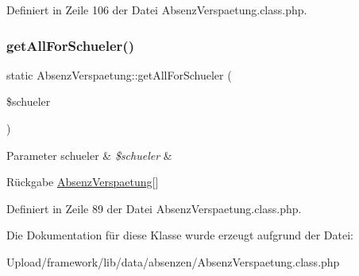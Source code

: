 Definiert in Zeile 106 der Datei Absenz\+Verspaetung.\+class.\+php.

\mbox{\label{class_absenz_verspaetung_a894d4ccf9e72dd77cf6ef4150ca27cc3}} 
\subsubsection{\texorpdfstring{get\+All\+For\+Schueler()}{getAllForSchueler()}}
{\footnotesize\ttfamily static Absenz\+Verspaetung\+::get\+All\+For\+Schueler (\begin{DoxyParamCaption}\item[{}]{\$schueler }\end{DoxyParamCaption})\hspace{0.3cm}{\ttfamily [static]}}


\begin{DoxyParams}[1]{Parameter}
schueler & {\em \$schueler} & \\
\hline
\end{DoxyParams}
\begin{DoxyReturn}{Rückgabe}
\mbox{\hyperlink{class_absenz_verspaetung}{Absenz\+Verspaetung}}\mbox{[}\mbox{]} 
\end{DoxyReturn}


Definiert in Zeile 89 der Datei Absenz\+Verspaetung.\+class.\+php.



Die Dokumentation für diese Klasse wurde erzeugt aufgrund der Datei\+:\begin{DoxyCompactItemize}
\item 
Upload/framework/lib/data/absenzen/Absenz\+Verspaetung.\+class.\+php\end{DoxyCompactItemize}
